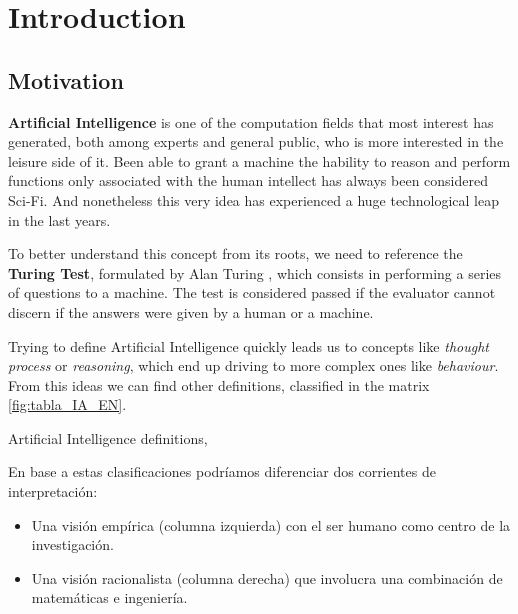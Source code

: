 \chapter{Introduction}



\section{Motivation}

\textbf{Artificial Intelligence} is one of the computation fields that most interest has generated, both among experts and general public, who is more interested in the leisure side of it. Been able to grant a machine the hability to reason and perform functions only associated with the human intellect has always been considered Sci-Fi. And nonetheless this very idea has experienced a huge technological leap in the last years.

To better understand this concept from its roots, we need to reference the \textbf{Turing Test}, formulated by Alan Turing \citep{Turing1950-TURCMA}, which consists in performing a series of questions to a machine. The test is considered passed if the evaluator cannot discern if the answers were given by a human or a machine.

Trying to define Artificial Intelligence quickly leads us to concepts like \textit{thought process} or \textit{reasoning}, which end up driving to more complex ones like \textit{behaviour}. From this ideas we can find other definitions, classified in the matrix \ref{fig:tabla_IA_EN}.

%
       {Artificial Intelligence definitions, \citet{Russell:2009:AIM:1671238}}

En base a estas clasificaciones podríamos diferenciar dos corrientes de interpretación:
\begin{itemize}
    \item Una visión empírica (columna izquierda) con el ser humano como centro de la investigación.
    \item Una visión racionalista (columna derecha) que involucra una combinación de matemáticas e ingeniería.
\end{itemize}

